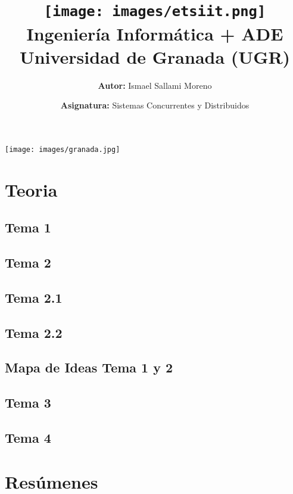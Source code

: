 \documentclass[a4paper,12pt]{article}
\title{
    \vspace{-2cm}
    \texttt{[image: images/etsiit.png]} \\ %
    \LARGE Ingeniería Informática + ADE\\
    \large Universidad de Granada (UGR)\\[1cm]
}
\author{\textbf{Autor:} Ismael Sallami Moreno}
\date{\textbf{Asignatura:} Sistemas Concurrentes y Distribuidos}
\begin{document}
\maketitle
\thispagestyle{empty}

\begin{center}
    \texttt{[image: images/granada.jpg]} \\ %
    \vfill
\end{center}

\newpage

\tableofcontents
\newpage

\section{Teoria}
\subsection{Tema 1}

\subsection{Tema 2}
\subsection{Tema 2.1}

\subsection{Tema 2.2}

\subsection{Mapa de Ideas Tema 1 y 2}

\subsection{Tema 3}

\subsection{Tema 4}


\section{Resúmenes}

\end{document}
